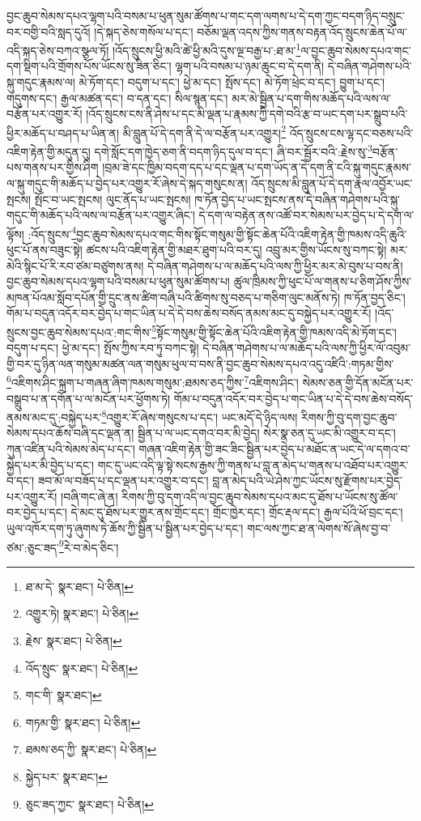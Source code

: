 བྱང་ཆུབ་སེམས་དཔའ་ལྷག་པའི་བསམ་པ་ཕུན་སུམ་ཚོགས་པ་གང་དག་ལགས་པ་དེ་དག་ཀྱང་བདག་ཉིད་བསྲུང་བར་བགྱི་བའི་སླད་དུའོ། །དེ་སྐད་ཅེས་གསོལ་པ་དང་། བཅོམ་ལྡན་འདས་ཀྱིས་གནས་བརྟན་འོད་སྲུངས་ཆེན་པོ་ལ་འདི་སྐད་ཅེས་བཀའ་སྩལ་ཏོ། །འོད་སྲུངས་ཕྱི་མའི་ཚེ་ཕྱི་མའི་དུས་ལྔ་བརྒྱ་པ་:ཐ་མ་\footnote{ཐ་མ་དེ་  སྣར་ཐང་།  པེ་ཅིན། }ལ་བྱང་ཆུབ་སེམས་དཔའ་གང་དག་སྡིག་པའི་གྲོགས་པོས་ཡོངས་སུ་ཟིན་ཅིང་། ལྷག་པའི་བསམ་པ་ཉམ་ཆུང་བ་དེ་དག་ནི། དེ་བཞིན་གཤེགས་པའི་སྐུ་གདུང་རྣམས་ལ། མེ་ཏོག་དང་། བདུག་པ་དང་། ཕྱེ་མ་དང་། སྤོས་དང་། མེ་ཏོག་ཕྲེང་བ་དང་། བྱུག་པ་དང་། གདུགས་དང་། རྒྱལ་མཚན་དང་། བ་དན་དང་། སིལ་སྙན་དང་། མར་མེ་སྦྱིན་པ་དག་གིས་མཆོད་པའི་ལས་ལ་བརྩོན་པར་འགྱུར་རོ། །འོད་སྲུངས་ངས་ནི་ཤེས་པ་དང་མི་ལྡན་པ་རྣམས་ཀྱི་དགེ་བའི་རྩ་བ་ཡང་དག་པར་སྒྲུབ་པའི་ཕྱིར་མཆོད་པ་བཤད་པ་ཡིན་ན། མི་བླུན་པོ་དེ་དག་ནི་དེ་ལ་བརྩོན་པར་འགྱུར།\footnote{འགྱུར་ཏེ།  སྣར་ཐང་།  པེ་ཅིན། } འོད་སྲུངས་ངས་ལྷ་དང་བཅས་པའི་འཇིག་རྟེན་གྱི་མདུན་དུ། དགེ་སློང་དག་ཁྱེད་ཅག་ནི་བདག་ཉིད་དུལ་བ་དང་། ཞི་བར་སྦྱོར་བའི་:རྗེས་སུ་\footnote{རྗེས་  སྣར་ཐང་།  པེ་ཅིན། }བརྩོན་པས་གནས་པར་གྱིས་ཤིག །བྲམ་ཟེ་དང་ཁྱིམ་བདག་དད་པ་དང་ལྡན་པ་དག་ཡོད་ན་དེ་དག་ནི་ངའི་སྐུ་གདུང་རྣམས་ལ་སྐུ་གདུང་གི་མཆོད་པ་བྱེད་པར་འགྱུར་རོ་ཞེས་དེ་སྐད་གསུངས་ན། འོད་སྲུངས་མི་བླུན་པོ་དེ་དག་རྣལ་འབྱོར་ཡང་སྤངས། སྤོང་བ་ཡང་སྤངས། ལུང་ནོད་པ་ཡང་སྤངས། ཁ་ཏོན་བྱེད་པ་ཡང་སྤངས་ནས་དེ་བཞིན་གཤེགས་པའི་སྐུ་གདུང་གི་མཆོད་པའི་ལས་ལ་བརྩོན་པར་འགྱུར་ཞིང་། དེ་དག་ལ་བརྟེན་ནས་འཚོ་བར་སེམས་པར་བྱེད་པ་དེ་དག་ལ་ལྟོས། :འོད་སྲུངས་\footnote{འོད་སྲུང་  སྣར་ཐང་།  པེ་ཅིན། }བྱང་ཆུབ་སེམས་དཔའ་གང་གིས་སྟོང་གསུམ་གྱི་སྟོང་ཆེན་པོའི་འཇིག་རྟེན་གྱི་ཁམས་འདི་ཆུའི་ཕུང་པོ་ནས་བཟུང་སྟེ། ཚངས་པའི་འཇིག་རྟེན་གྱི་མཐར་ཐུག་པའི་བར་དུ། འབྲུ་མར་གྱིས་ཡོངས་སུ་བཀང་སྟེ། མར་མེའི་སྙིང་པོ་རི་རབ་ཙམ་བཙུགས་ནས། དེ་བཞིན་གཤེགས་པ་ལ་མཆོད་པའི་ལས་ཀྱི་ཕྱིར་མར་མེ་བུས་པ་བས་ནི། བྱང་ཆུབ་སེམས་དཔའ་ལྷག་པའི་བསམ་པ་ཕུན་སུམ་ཚོགས་པ། ཚུལ་ཁྲིམས་ཀྱི་ཕུང་པོ་ལ་གནས་པ་ཅིག་ཤོས་ཀྱིས་མཁན་པོའམ་སློབ་དཔོན་གྱི་དྲུང་ནས་ཚིག་བཞི་པའི་ཚིགས་སུ་བཅད་པ་གཅིག་ལུང་མནོས་ཏེ། ཁ་ཏོན་བྱད་ཅིང་། གོམ་པ་བདུན་འདོར་བར་བྱེད་པ་གང་ཡིན་པ་དེ་དེ་བས་ཆེས་བསོད་ནམས་མང་དུ་བསྐྱེད་པར་འགྱུར་རོ། །འོད་སྲུངས་བྱང་ཆུབ་སེམས་དཔའ་:གང་གིས་\footnote{གང་གི་  སྣར་ཐང་། }སྟོང་གསུམ་གྱི་སྟོང་ཆེན་པོའི་འཇིག་རྟེན་གྱི་ཁམས་འདི་མེ་ཏོག་དང་། བདུག་པ་དང་། ཕྱེ་མ་དང་། སྤོས་ཀྱིས་རབ་ཏུ་བཀང་སྟེ། དེ་བཞིན་གཤེགས་པ་ལ་མཆོད་པའི་ལས་ཀྱི་ཕྱིར་ལོ་འབུམ་གྱི་བར་དུ་ཉིན་ལན་གསུམ་མཚན་ལན་གསུམ་ཕུལ་བ་བས་ནི་བྱང་ཆུབ་སེམས་དཔའ་འདུ་འཛིའི་:གཏམ་གྱིས་\footnote{གཏམ་གྱི་  སྣར་ཐང་།  པེ་ཅིན། }འཇིགས་ཤིང་སྐྲག་པ་གཞན་ཞིག་ཁམས་གསུམ་:ཐམས་ཅད་ཀྱིས་\footnote{ཐམས་ཅད་ཀྱི་  སྣར་ཐང་།  པེ་ཅིན། }འཇིགས་ཤིང་། སེམས་ཅན་གྱི་དོན་མངོན་པར་བསྒྲུབ་པ་ན་དགོན་པ་ལ་མངོན་པར་ཕྱོགས་ཏེ། གོམ་པ་བདུན་འདོར་བར་བྱེད་པ་གང་ཡིན་པ་དེ་དེ་བས་ཆེས་བསོད་ནམས་མང་དུ་:བསྐྱེད་པར་\footnote{སྐྱེད་པར་  སྣར་ཐང་། }འགྱུར་རོ་ཞེས་གསུངས་པ་དང་། ཡང་མདོ་དེ་ཉིད་ལས། རིགས་ཀྱི་བུ་དག་བྱང་ཆུབ་སེམས་དཔའ་ཆོས་བཞི་དང་ལྡན་ན། སྦྱིན་པ་ལ་ཡང་དགའ་བར་མི་བྱེད། སེར་སྣ་ཅན་དུ་ཡང་མི་འགྱུར་བ་དང་། ཀུན་འཛིན་པའི་སེམས་མེད་པ་དང་། གཞན་འཇིག་རྟེན་གྱི་ཟང་ཟིང་སྦྱིན་པར་བྱེད་པ་མཐོང་ན་ཡང་དེ་ལ་དགའ་བ་སྐྱེད་པར་མི་བྱེད་པ་དང་། གང་དུ་ཡང་འདི་ལྟ་སྟེ་སངས་རྒྱས་ཀྱི་གནས་པ་བླ་ན་མེད་པ་གནས་པ་འཐོབ་པར་འགྱུར་བ་དང་། ཟབ་མོ་ལ་བཟོད་པ་དང་ལྡན་པར་འགྱུར་བ་དང་། བླ་ན་མེད་པའི་ཡེ་ཤེས་ཀྱང་ཡོངས་སུ་རྫོགས་པར་བྱེད་པར་འགྱུར་རོ། །བཞི་གང་ཞེ་ན། རིགས་ཀྱི་བུ་དག་འདི་ལ་བྱང་ཆུབ་སེམས་དཔའ་མང་དུ་ཐོས་པ་ཡོངས་སུ་ཚོལ་བར་བྱེད་པ་དང་། དེ་མང་དུ་ཐོས་པར་གྱུར་ནས་གྲོང་དང་། གྲོང་ཁྱེར་དང་། གྲོང་རྡལ་དང་། རྒྱལ་པོའི་ཕོ་བྲང་དང་། ཡུལ་འཁོར་དག་ཏུ་ཞུགས་ཏེ་ཆོས་ཀྱི་སྦྱིན་པ་སྦྱིན་པར་བྱེད་པ་དང་། གང་ལས་ཀྱང་ཐ་ན་ལེགས་སོ་ཞེས་བྱ་བ་ཙམ་:ཅུང་ཟད་\footnote{ཅུང་ཟད་ཀྱང་  སྣར་ཐང་།  པེ་ཅིན། }རེ་བ་མེད་ཅིང་། 